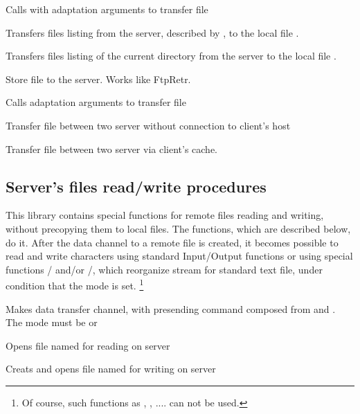 {
 Calls  with adaptation arguments to transfer file
}

{
 Transfers files listing from the server, described by , to the local file .
}

{
 Transfers files listing of the current directory from the server to the local file .
}

{
  Store file to the server. Works like FtpRetr.
}

{
 Calls  adaptation arguments to transfer file 
}

{
 Transfer file between two server without connection to client's host
}

{
 Transfer file between two server via client's cache.
}

\subsection{Server's files read/write procedures}

This library contains special functions for remote files reading and 
writing, without precopying them to local files. The functions, 
which are described below, do it. After the data channel 
to a remote file is created, it becomes possible to read and write
 characters using standard Input/Output functions
or using special functions / and/or
/, which reorganize stream for standard text file, 
under condition that the  mode is set. 
\footnote{Of course, such functions as , , .... 
can not be used.}

{ Makes data transfer channel, with presending command composed from  and . 
The mode must be  or }

{ Opens file named  for reading on server}

{ Creats and opens file named  for writing on server}

